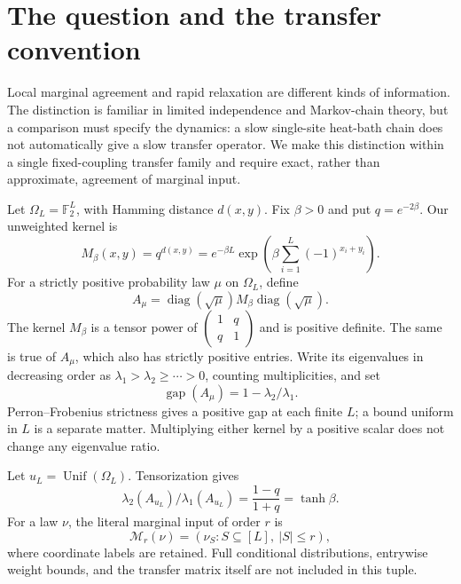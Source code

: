 \documentclass[11pt]{article}
\newcommand{\F}{\mathbb F}
\newcommand{\diag}{\operatorname{diag}}
\newcommand{\gap}{\operatorname{gap}}
\newcommand{\Unif}{\operatorname{Unif}}
\begin{document}
\section{The question and the transfer convention}
Local marginal agreement and rapid relaxation are different kinds of
information. The distinction is familiar in limited independence and
Markov-chain theory, but a comparison must specify the dynamics: a slow
single-site heat-bath chain does not automatically give a slow transfer
operator. We make this distinction within a single fixed-coupling transfer
family and require exact, rather than approximate, agreement of marginal
input.

Let $\Omega_L=\F_2^L$, with Hamming distance $d(x,y)$. Fix $\beta>0$ and put
$q=e^{-2\beta}$. Our unweighted kernel is
\begin{equation}\label{eq:kernel}
 M_\beta(x,y)=q^{d(x,y)}
 =e^{-\beta L}\exp\!\left(\beta\sum_{i=1}^L(-1)^{x_i+y_i}\right).
\end{equation}
For a strictly positive probability law $\mu$ on $\Omega_L$, define
\begin{equation}\label{eq:weighted}
 A_\mu=\diag(\sqrt\mu)M_\beta\diag(\sqrt\mu).
\end{equation}
The kernel $M_\beta$ is a tensor power of
$\left(\begin{smallmatrix}1&q\\q&1\end{smallmatrix}\right)$ and is positive
definite. The same is true of $A_\mu$, which also has strictly positive
entries. Write its eigenvalues in decreasing order as
$\lambda_1>\lambda_2\ge\cdots>0$, counting multiplicities, and set
\[
 \gap(A_\mu)=1-\lambda_2/\lambda_1.
\]
Perron--Frobenius strictness gives a positive gap at each finite $L$; a
bound uniform in $L$ is a separate matter. Multiplying either kernel by
a positive scalar does not change any eigenvalue ratio.

Let $u_L=\Unif(\Omega_L)$. Tensorization gives
\begin{equation}\label{eq:product}
 \lambda_2(A_{u_L})/\lambda_1(A_{u_L})
       =\frac{1-q}{1+q}=\tanh\beta.
\end{equation}
For a law $\nu$, the literal marginal input of order $r$ is
\begin{equation}\label{eq:input}
 \mathcal M_r(\nu)=(\nu_S:S\subseteq[L],\ |S|\le r),
\end{equation}
where coordinate labels are retained. Full conditional distributions,
entrywise weight bounds, and the transfer matrix itself are not included
in this tuple.
\end{document}
